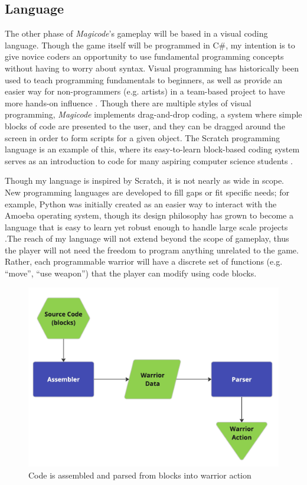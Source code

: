 \documentclass[10pt,twocolumn]{article}
\begin{document}
\subsection{Language}
The other phase of \textit{Magicode}’s gameplay will be based in a visual coding language. Though the game itself will be programmed in C\#, my intention is to give novice coders an opportunity to use fundamental programming concepts without having to worry about syntax. Visual programming has historically been used to teach programming fundamentals to beginners, as well as provide an easier way for non-programmers (e.g. artists) in a team-based project to have more hands-on influence \cite{visual-oop}. Though there are multiple styles of visual programming, \textit{Magicode} implements drag-and-drop coding, a system where simple blocks of code are presented to the user, and they can be dragged around the screen in order to form scripts for a given object. The Scratch programming language is an example of this, where its easy-to-learn block-based coding system serves as an introduction to code for many aspiring computer science students \cite{scratch-website}.

Though my language is inspired by Scratch, it is not nearly as wide in scope. New programming languages are developed to fill gaps or fit specific needs; for example, Python was initially created as an easier way to interact with the Amoeba operating system, though its design philosophy has grown to become a language that is easy to learn yet robust enough to handle large scale projects \cite{why-python}.The reach of my language will not extend beyond the scope of gameplay, thus the player will not need the freedom to program anything unrelated to the game. Rather, each programmable warrior will have a discrete set of functions (e.g. “move”, “use weapon”) that the player can modify using code blocks.

\begin{figure}
    \centering
    \includegraphics[width=\linewidth]{images/compiler.jpg}
    \caption{Code is assembled and parsed from blocks into warrior action}
    \label{fig:compiler-diagram}
\end{figure}
\end{document}
